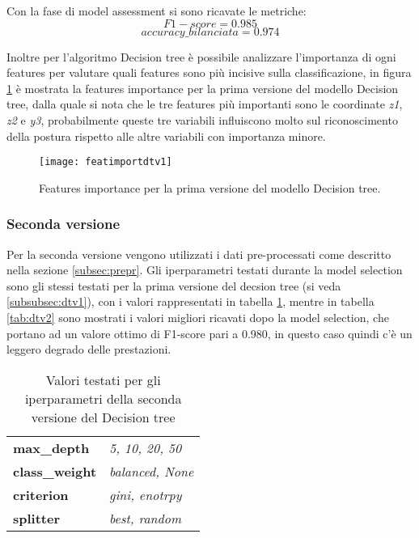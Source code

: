Con la fase di model assessment si sono ricavate le metriche: $$F1-score = 0.985$$ $$accuracy\_bilanciata = 0.974$$

Inoltre per l'algoritmo Decision tree è possibile analizzare l'importanza di ogni features per valutare quali features sono più incisive sulla classificazione, in figura \ref{fig:featuresimportancedtv1} è mostrata la features importance per la prima versione del modello Decision tree, dalla quale si nota che le tre features più importanti sono le coordinate \textit{z1}, \textit{z2} e \textit{y3}, probabilmente queste tre variabili influiscono molto sul riconoscimento della postura rispetto alle altre variabili con importanza minore. 

\begin{figure}[h]
    \centering\texttt{[image: featimportdtv1]}
    \caption{Features importance per la prima versione del modello Decision tree.}
    \label{fig:featuresimportancedtv1}
\end{figure}

\subsubsection{Seconda versione}
Per la seconda versione vengono utilizzati i dati pre-processati come descritto nella sezione \ref{subsec:prepr}.  Gli iperparametri testati durante la model selection sono gli stessi testati per la prima versione del decsion tree (si veda \ref{subsubsec:dtv1}), con i valori rappresentati in tabella \ref{tab:valdtv2}, mentre in tabella \ref{tab:dtv2} sono mostrati i valori migliori ricavati dopo la model selection, che portano ad un valore ottimo di F1-score pari a 0.980, in questo caso quindi c'è un leggero degrado delle prestazioni.

\begin{table}[h] 
\centering
\begin{tabular}{l l}
\hline
\textbf{max\_depth} & \textit{5, 10, 20, 50}\\
\textbf{class\_weight} & \textit{balanced, None}\\
\textbf{criterion} & \textit{gini, enotrpy}\\
\textbf{splitter} & \textit{best, random}\\
\hline
\end{tabular}
\caption{Valori testati per gli iperparametri della seconda versione del Decision tree}
\label{tab:valdtv2}
\end{table}

